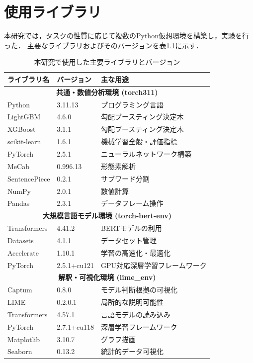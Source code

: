 \documentclass[uplatex, dvipdfmx, 11pt, a4paper, report]{jsbook}
\begin{document}

\appendix




\chapter{使用ライブラリ}
\label{app:environment}

本研究では，タスクの性質に応じて複数のPython仮想環境を構築し，実験を行った．
主要なライブラリおよびそのバージョンを表\ref{tab:lib_versions}に示す．

\begin{table}[H]
  \centering
  \small
  \caption{本研究で使用した主要ライブラリとバージョン}
  \label{tab:lib_versions}
  \begin{tabular}{l|l|l} \hline
    ライブラリ名 & バージョン & 主な用途 \\ \hline \hline
    \multicolumn{3}{c}{\textbf{共通・数値分析環境 (torch311)}} \\ \hline
    Python & 3.11.13 & プログラミング言語 \\
    LightGBM & 4.6.0 & 勾配ブースティング決定木 \\
    XGBoost & 3.1.1 & 勾配ブースティング決定木 \\
    scikit-learn & 1.6.1 & 機械学習全般・評価指標 \\
    PyTorch & 2.5.1 & ニューラルネットワーク構築 \\
    MeCab & 0.996.13 & 形態素解析 \\
    SentencePiece & 0.2.1 & サブワード分割 \\
    NumPy & 2.0.1 & 数値計算 \\
    Pandas & 2.3.1 & データフレーム操作 \\ \hline
    \multicolumn{3}{c}{\textbf{大規模言語モデル環境 (torch-bert-env)}} \\ \hline
    Transformers & 4.41.2 & BERTモデルの利用 \\
    Datasets & 4.1.1 & データセット管理 \\
    Accelerate & 1.10.1 & 学習の高速化・最適化 \\
    PyTorch & 2.5.1+cu121 & GPU対応深層学習フレームワーク \\ \hline
    \multicolumn{3}{c}{\textbf{解釈・可視化環境 (lime\_env)}} \\ \hline
    Captum & 0.8.0 & モデル判断根拠の可視化 \\
    LIME & 0.2.0.1 & 局所的な説明可能性 \\
    Transformers & 4.57.1 & 言語モデルの読み込み \\
    PyTorch & 2.7.1+cu118 & 深層学習フレームワーク \\
    Matplotlib & 3.10.7 & グラフ描画 \\
    Seaborn & 0.13.2 & 統計的データ可視化 \\ \hline
  \end{tabular}
\end{table}
\end{document}
